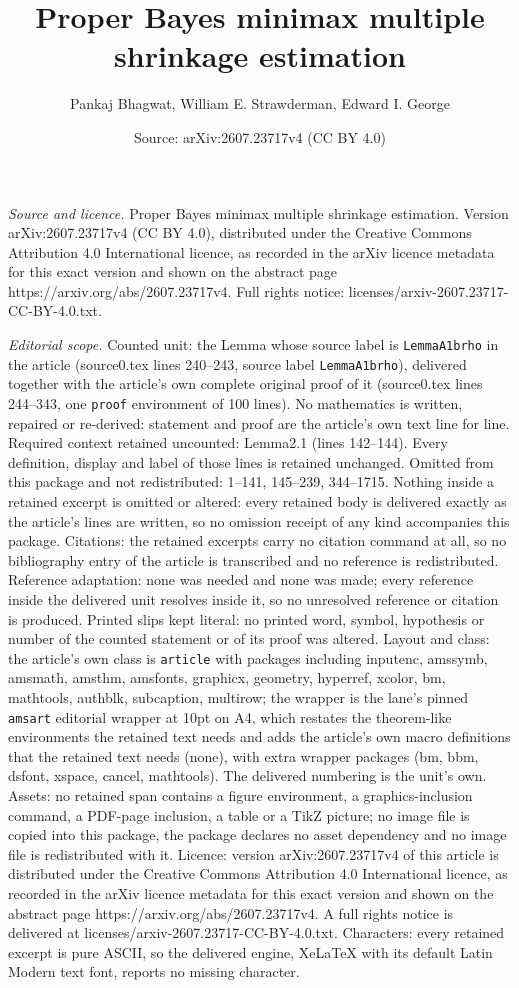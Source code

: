 \documentclass[10pt,a4paper]{amsart}
\title[Proper Bayes minimax multiple shrinkage estimation]{Proper Bayes minimax multiple shrinkage estimation}
\author{Pankaj Bhagwat, William E. Strawderman, Edward I. George}
\date{Source: arXiv:2607.23717v4 (CC BY 4.0)}
\begin{document}
\maketitle

\noindent\emph{Source and licence.} Proper Bayes minimax multiple shrinkage estimation. Version arXiv:2607.23717v4 (CC BY 4.0), distributed under the Creative Commons Attribution 4.0 International licence, as recorded in the arXiv licence metadata for this exact version and shown on the abstract page https://arxiv.org/abs/2607.23717v4. Full rights notice: licenses/arxiv-2607.23717-CC-BY-4.0.txt.\par\smallskip

\noindent\textit{Editorial scope.} Counted unit: the Lemma whose source label is \texttt{LemmaA1brho} in the article (source0.tex lines 240--243, source label \texttt{LemmaA1brho}), delivered together with the article's own complete original proof of it (source0.tex lines 244--343, one \texttt{proof} environment of 100 lines). No mathematics is written, repaired or re-derived: statement and proof are the article's own text line for line. Required context retained uncounted: Lemma2.1 (lines 142--144). Every definition, display and label of those lines is retained unchanged. Omitted from this package and not redistributed: 1--141, 145--239, 344--1715. Nothing inside a retained excerpt is omitted or altered: every retained body is delivered exactly as the article's lines are written, so no omission receipt of any kind accompanies this package. Citations: the retained excerpts carry no citation command at all, so no bibliography entry of the article is transcribed and no reference is redistributed. Reference adaptation: none was needed and none was made; every reference inside the delivered unit resolves inside it, so no unresolved reference or citation is produced. Printed slips kept literal: no printed word, symbol, hypothesis or number of the counted statement or of its proof was altered. Layout and class: the article's own class is \texttt{article} with packages including inputenc, amssymb, amsmath, amsthm, amsfonts, graphicx, geometry, hyperref, xcolor, bm, mathtools, authblk, subcaption, multirow; the wrapper is the lane's pinned \texttt{amsart} editorial wrapper at 10pt on A4, which restates the theorem-like environments the retained text needs and adds the article's own macro definitions that the retained text needs (none), with extra wrapper packages (bm, bbm, dsfont, xspace, cancel, mathtools). The delivered numbering is the unit's own. Assets: no retained span contains a figure environment, a graphics-inclusion command, a PDF-page inclusion, a table or a TikZ picture; no image file is copied into this package, the package declares no asset dependency and no image file is redistributed with it. Licence: version arXiv:2607.23717v4 of this article is distributed under the Creative Commons Attribution 4.0 International licence, as recorded in the arXiv licence metadata for this exact version and shown on the abstract page https://arxiv.org/abs/2607.23717v4. A full rights notice is delivered at licenses/arxiv-2607.23717-CC-BY-4.0.txt. Characters: every retained excerpt is pure ASCII, so the delivered engine, XeLaTeX with its default Latin Modern text font, reports no missing character.
\end{document}
